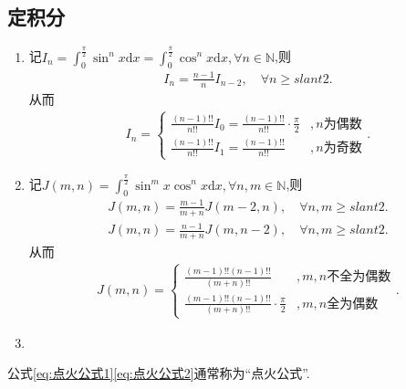 \documentclass[../../main.tex]{subfiles}
\begin{document}
\subsection{定积分}

\begin{enumerate}
\item 记$I_n=\int_0^{\frac{\pi}{2}}\sin^n x\mathrm{d}x=\int_0^{\frac{\pi}{2}}\cos^n x\mathrm{d}x,\forall n\in \mathbb{N}$,则
\begin{align*}
I_n=\frac{n-1}{n}I_{n-2},\quad \forall n\geqslant slant 2.
\end{align*}
从而
\begin{align}\label{eq:点火公式1}
I_n=
\begin{cases}
\frac{(n-1)!!}{n!!}I_0=\frac{(n-1)!!}{n!!}\cdot \frac{\pi}{2}&,n\text{为偶数}\\
\frac{(n-1)!!}{n!!}I_1=\frac{(n-1)!!}{n!!}&,n\text{为奇数}
\end{cases}.
\end{align}

\item 记$J(m,n)=\int_0^{\frac{\pi}{2}}\sin^m x\cos^n x\mathrm{d}x,\forall n,m\in \mathbb{N}$,则
\begin{align*}
J(m,n)=\frac{m-1}{m+n}J(m-2,n),\quad \forall n,m\geqslant slant 2.
\end{align*}
\begin{align*}
J(m,n)=\frac{n-1}{m+n}J(m,n-2),\quad \forall n,m\geqslant slant 2.
\end{align*}
从而
\begin{align}\label{eq:点火公式2}
J(m,n)=
\begin{cases}
\frac{(m-1)!!(n-1)!!}{(m+n)!!}&,m,n\text{不全为偶数}\\
\frac{(m-1)!!(n-1)!!}{(m+n)!!}\cdot \frac{\pi}{2}&,m,n\text{全为偶数}
\end{cases}.
\end{align}

\item 
\end{enumerate}
\begin{remark}
公式\eqref{eq:点火公式1}\eqref{eq:点火公式2}通常称为“点火公式”.
\end{remark}
\end{document}
